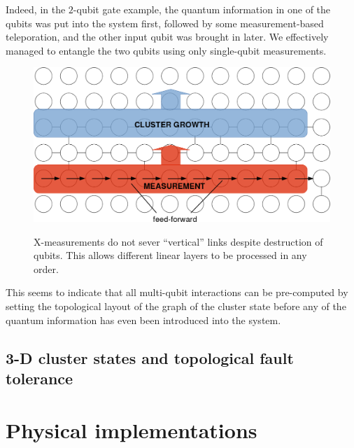 \documentclass[twocolumn]{Styles/IEEEtran11}
\begin{document}
Indeed, in the $2$-qubit gate example, the quantum information in one of the qubits was put into the system first, followed by some measurement-based teleporation, and the other input qubit was brought in later. We effectively managed to entangle the two qubits using only single-qubit measurements.

\begin{figure}[hbt]
  \centering
  \includegraphics[width=\linewidth]{Images/parallel02.png}
  \label{parallelfig2}
  \caption{X-measurements do not sever ``vertical'' links despite destruction of qubits. This allows different linear layers to be processed in any order.}
\end{figure}

This seems to indicate that all multi-qubit interactions can be pre-computed by setting the topological layout of the graph of the cluster state before any of the quantum information has even been introduced into the system. 


\subsection{3-D cluster states and topological fault tolerance}

\section{Physical implementations}
\end{document}
